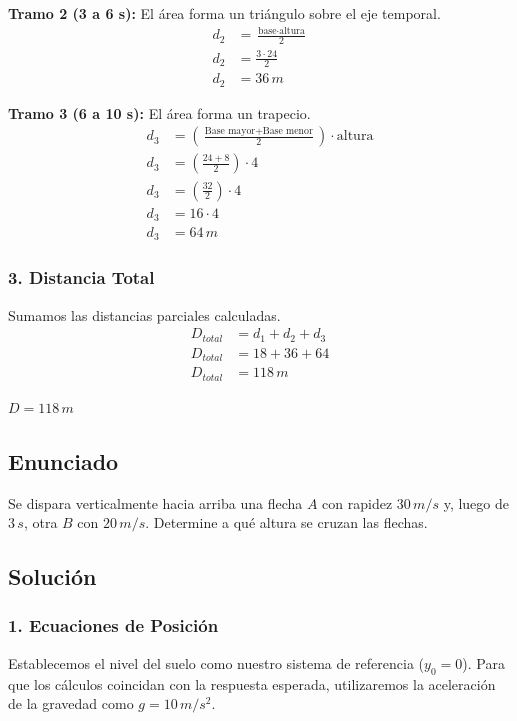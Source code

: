 \documentclass[12pt, a4paper]{article}
\begin{document}
\textbf{Tramo 2 (3 a 6 s):}
El área forma un triángulo sobre el eje temporal.
\begin{align*}
d_2 &= \frac{\text{base} \cdot \text{altura}}{2} \\
d_2 &= \frac{3 \cdot 24}{2} \\
d_2 &= 36 \, \si{m}
\end{align*}

\textbf{Tramo 3 (6 a 10 s):}
El área forma un trapecio.
\begin{align*}
d_3 &= \left( \frac{\text{Base mayor} + \text{Base menor}}{2} \right) \cdot \text{altura} \\
d_3 &= \left( \frac{24 + 8}{2} \right) \cdot 4 \\
d_3 &= \left( \frac{32}{2} \right) \cdot 4 \\
d_3 &= 16 \cdot 4 \\
d_3 &= 64 \, \si{m}
\end{align*}

\subsubsection*{3. Distancia Total}
Sumamos las distancias parciales calculadas.
\begin{align*}
D_{total} &= d_1 + d_2 + d_3 \\
D_{total} &= 18 + 36 + 64 \\
D_{total} &= 118 \, \si{m}
\end{align*}

\begin{tcolorbox}[colback=green!5!white, colframe=green!50!black, title=Respuesta Final]
\centering \Large $D = 118 \, \si{m}$
\end{tcolorbox}

\newpage

\subsection*{Enunciado}
Se dispara verticalmente hacia arriba una flecha $A$ con rapidez $30 \, \si{m/s}$ y, luego de $3 \, \si{s}$, otra $B$ con $20 \, \si{m/s}$. Determine a qué altura se cruzan las flechas.

\subsection*{Solución}

\subsubsection*{1. Ecuaciones de Posición}
Establecemos el nivel del suelo como nuestro sistema de referencia ($y_0 = 0$). Para que los cálculos coincidan con la respuesta esperada, utilizaremos la aceleración de la gravedad como $g = 10 \, \si{m/s^2}$. 
\end{document}
